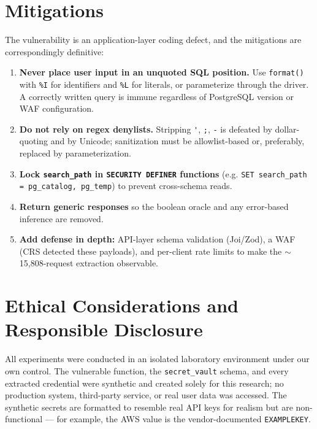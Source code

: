 \documentclass[11pt]{article}
\begin{document}
\section{Mitigations}

The vulnerability is an application-layer coding defect, and the mitigations are
correspondingly definitive:

\begin{enumerate}[leftmargin=1.8em]
  \item \textbf{Never place user input in an unquoted SQL position.} Use
        \lstinline|format()| with \lstinline|%I| for identifiers and
        \lstinline|%L| for literals, or parameterize through the driver. A
        correctly written query is immune regardless of PostgreSQL version or WAF
        configuration.
  \item \textbf{Do not rely on regex denylists.} Stripping \lstinline|'|,
        \lstinline|;|, \lstinline|-| is defeated by dollar-quoting and by Unicode;
        sanitization must be allowlist-based or, preferably, replaced by
        parameterization.
  \item \textbf{Lock \lstinline|search_path| in \lstinline|SECURITY DEFINER|
        functions} (e.g. \lstinline|SET search_path = pg_catalog, pg_temp|) to
        prevent cross-schema reads.
  \item \textbf{Return generic responses} so the boolean oracle and any
        error-based inference are removed.
  \item \textbf{Add defense in depth:} API-layer schema validation (Joi/Zod), a
        WAF (CRS detected these payloads), and per-client rate limits to make the
        $\sim$15,808-request extraction observable.
\end{enumerate}

\section{Ethical Considerations and Responsible Disclosure}

All experiments were conducted in an isolated laboratory environment under our own
control. The vulnerable function, the \lstinline|secret_vault| schema, and every
extracted credential were synthetic and created solely for this research; no
production system, third-party service, or real user data was accessed. The
synthetic secrets are formatted to resemble real API keys for realism but are
non-functional --- for example, the AWS value is the vendor-documented
\lstinline|EXAMPLEKEY|.
\end{document}
